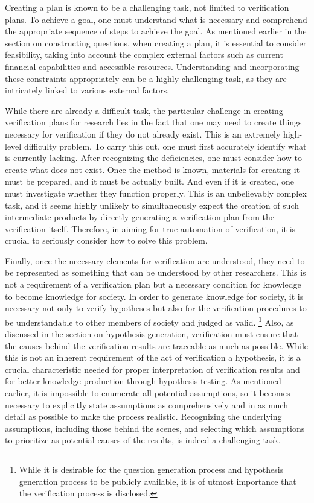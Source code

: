 Creating a plan is known to be a challenging task, not limited to verification plans. To achieve a goal, one must understand what is necessary and comprehend the appropriate sequence of steps to achieve the goal. As mentioned earlier in the section on constructing questions, when creating a plan, it is essential to consider feasibility, taking into account the complex external factors such as current financial capabilities and accessible resources. Understanding and incorporating these constraints appropriately can be a highly challenging task, as they are intricately linked to various external factors.

While there are already a difficult task, the particular challenge in creating verification plans for research lies in the fact that one may need to create things necessary for verification if they do not already exist. This is an extremely high-level difficulty problem. To carry this out, one must first accurately identify what is currently lacking. After recognizing the deficiencies, one must consider how to create what does not exist. Once the method is known, materials for creating it must be prepared, and it must be actually built. And even if it is created, one must investigate whether they function properly. This is an unbelievably complex task, and it seems highly unlikely to simultaneously expect the creation of such intermediate products by directly generating a verification plan from the verification itself. Therefore, in aiming for true automation of verification, it is crucial to seriously consider how to solve this problem.


Finally, once the necessary elements for verification are understood, they need to be represented as something that can be understood by other researchers. This is not a requirement of a verification plan but a necessary condition for knowledge to become knowledge for society. In order to generate knowledge for society, it is necessary not only to verify hypotheses but also for the verification procedures to be understandable to other members of society and judged as valid. \footnote{
While it is desirable for the question generation process and hypothesis generation process to be publicly available, it is of utmost importance that the verification process is disclosed. 
} Also, as discussed in the section on hypothesis generation, verification must ensure that the causes behind the verification results are traceable as much as possible. While this is not an inherent requirement of the act of verification a hypothesis, it is a crucial characteristic needed for proper interpretation of verification results and for better knowledge production through hypothesis testing. As mentioned earlier, it is impossible to enumerate all potential assumptions, so it becomes necessary to explicitly state assumptions as comprehensively and in as much detail as possible to make the process realistic. Recognizing the underlying assumptions, including those behind the scenes, and selecting which assumptions to prioritize as potential causes of the results, is indeed a challenging task.



